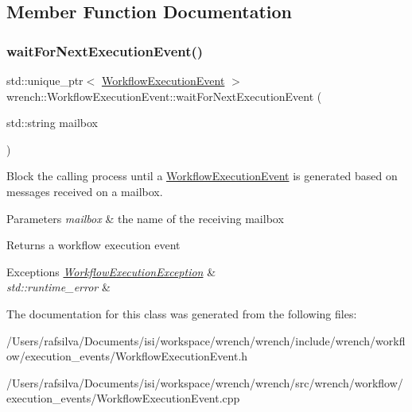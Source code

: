 \subsection{Member Function Documentation}
\mbox{\label{classwrench_1_1_workflow_execution_event_a7fc291240789553aa1a02ac693b858ba}} 
\subsubsection{\texorpdfstring{wait\+For\+Next\+Execution\+Event()}{waitForNextExecutionEvent()}}
{\footnotesize\ttfamily std\+::unique\+\_\+ptr$<$ \hyperlink{classwrench_1_1_workflow_execution_event}{Workflow\+Execution\+Event} $>$ wrench\+::\+Workflow\+Execution\+Event\+::wait\+For\+Next\+Execution\+Event (\begin{DoxyParamCaption}\item[{std\+::string}]{mailbox }\end{DoxyParamCaption})\hspace{0.3cm}{\ttfamily [static]}}



Block the calling process until a \hyperlink{classwrench_1_1_workflow_execution_event}{Workflow\+Execution\+Event} is generated based on messages received on a mailbox. 


\begin{DoxyParams}{Parameters}
{\em mailbox} & the name of the receiving mailbox \\
\hline
\end{DoxyParams}
\begin{DoxyReturn}{Returns}
a workflow execution event
\end{DoxyReturn}

\begin{DoxyExceptions}{Exceptions}
{\em \hyperlink{classwrench_1_1_workflow_execution_exception}{Workflow\+Execution\+Exception}} & \\
\hline
{\em std\+::runtime\+\_\+error} & \\
\hline
\end{DoxyExceptions}


The documentation for this class was generated from the following files\+:\begin{DoxyCompactItemize}
\item 
/\+Users/rafsilva/\+Documents/isi/workspace/wrench/wrench/include/wrench/workflow/execution\+\_\+events/Workflow\+Execution\+Event.\+h\item 
/\+Users/rafsilva/\+Documents/isi/workspace/wrench/wrench/src/wrench/workflow/execution\+\_\+events/Workflow\+Execution\+Event.\+cpp\end{DoxyCompactItemize}
